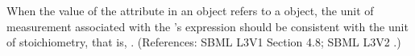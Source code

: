 When the value of the attribute  in an \InitialAssignment
object refers to a \SpeciesReference object, the unit of measurement
associated with the \InitialAssignment's  expression should be
consistent with the unit of stoichiometry, that is, .
(References: SBML L3V1 Section 4.8; SBML L3V2 .)
